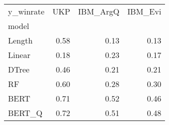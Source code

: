\begin{tabular}{lrrr}
\toprule
y\_winrate &   UKP &  IBM\_ArgQ &  IBM\_Evi \\
model  &       &           &          \\
\midrule
Length &  0.58 &      0.13 &     0.13 \\
Linear &  0.18 &      0.23 &     0.17 \\
DTree  &  0.46 &      0.21 &     0.21 \\
RF     &  0.60 &      0.28 &     0.30 \\
BERT   &  0.71 &      0.52 &     0.46 \\
BERT\_Q &  0.72 &      0.51 &     0.48 \\
\bottomrule
\end{tabular}
